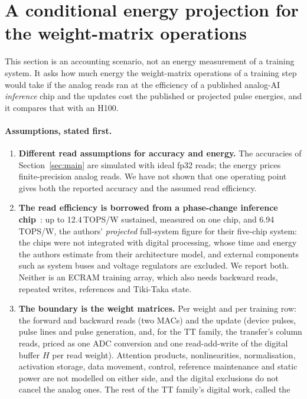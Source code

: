 \section{A conditional energy projection for the weight-matrix operations}\label{sec:energy}
This section is an accounting scenario, not an energy measurement of a training system. It asks how much energy the
weight-matrix operations of a training step would take if the analog reads ran at the efficiency of a published analog-AI
\emph{inference} chip and the updates cost the published or projected pulse energies, and it compares that with an H100.

\paragraph{Assumptions, stated first.}
\begin{enumerate}
\item \textbf{Different read assumptions for accuracy and energy.} The accuracies of Section~\ref{sec:main} are simulated with
      ideal fp32 reads; the energy prices finite-precision analog reads. We have not shown that one operating point gives both
      the reported accuracy and the assumed read efficiency.
\item \textbf{The read efficiency is borrowed from a phase-change inference chip}~\cite{ambrogio2023}: up to 12.4\,TOPS/W
      sustained, measured on one chip, and 6.94\,TOPS/W, the authors' \emph{projected} full-system figure for their five-chip
      system: the chips were not integrated with digital processing, whose time and energy the authors estimate from their
      architecture model, and external components such as system buses and voltage regulators are excluded. We report both. Neither is an ECRAM training array, which also needs
      backward reads, repeated writes, references and Tiki-Taka state.
\item \textbf{The boundary is the weight matrices.} Per weight and per training row: the forward and backward reads (two MACs)
      and the update (device pulses, pulse lines and pulse generation, and, for the TT family, the transfer's column reads, priced
      as one ADC conversion and one read-add-write of the digital buffer $H$ per read weight).
      Attention products, nonlinearities, normalisation, activation storage, data movement, control, reference maintenance and
      static power are not modelled on either side, and the digital exclusions do not cancel the analog ones. The rest of the TT family's digital work, called the

\end{enumerate}
